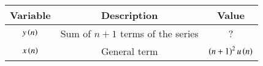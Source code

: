 \begin{tabular}[12pt]{ |c| c| c|}
    \hline
    \textbf{Variable} & \textbf{Description}&\textbf{Value}\\ 
    \hline
    $y\left(n\right)$ & Sum of $n+1$ terms of the series&?\\
    \hline
    $x\left(n\right)$ & General term& $\left(n+1\right)^2u\left(n\right)$\\
    \hline   
    \end{tabular}